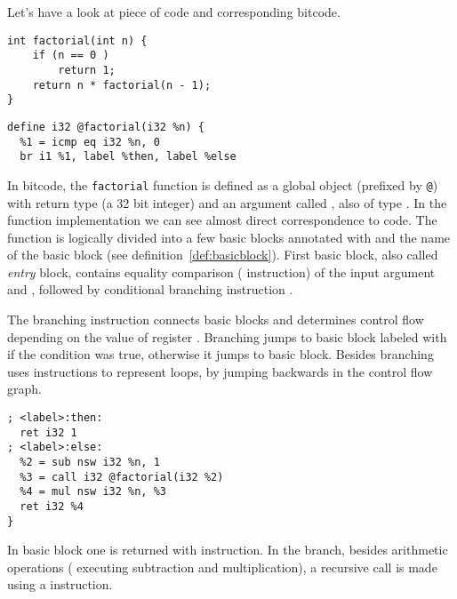 \begin{example}
Let's have a look at piece of \Cpp{} code and corresponding \LLVM bitcode.

\begin{verbatim}
int factorial(int n) {
    if (n == 0 )
        return 1;
    return n * factorial(n - 1);
}
\end{verbatim}

\begin{verbatim}
define i32 @factorial(i32 %n) {
  %1 = icmp eq i32 %n, 0
  br i1 %1, label %then, label %else
\end{verbatim}

\noindent
In \LLVM bitcode, the \texttt{factorial} function is defined as a global object (prefixed by \texttt{@})
 with return type  (a 32 bit integer) and an argument called ,
also of type . In the function implementation we can see almost direct
correspondence to \Cpp{} code. The function is logically divided into a few basic
blocks annotated with  and the name of the basic block (see definition~\autoref{def:basicblock}). First basic block, also called \emph{entry} block,
contains equality comparison ( instruction) of the input argument 
and , followed by conditional branching instruction .

The branching instruction connects basic blocks and determines control flow depending
on the value of register . Branching jumps to basic block labeled with  if
the condition  was true, otherwise it jumps to  basic block. Besides
branching \LLVM uses  instructions to represent loops, by jumping
backwards in the control flow graph.

\begin{verbatim}
; <label>:then:
  ret i32 1
; <label>:else:
  %2 = sub nsw i32 %n, 1
  %3 = call i32 @factorial(i32 %2)
  %4 = mul nsw i32 %n, %3
  ret i32 %4
}
\end{verbatim}

\noindent
In basic block  one is returned with  instruction. In the  branch,
besides arithmetic operations ( executing subtraction and  multiplication),
a recursive call is made using a  instruction.
\end{example}

